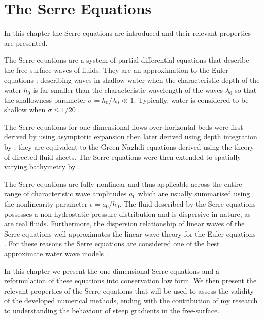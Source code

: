 
\chapter{The Serre Equations}
\label{chp:Serreeqns}
In this chapter the Serre equations are introduced and their relevant properties are presented.

The Serre equations are a system of partial differential equations that describe the free-surface waves of fluids. They are an approximation to the Euler equations \cite{Euler-1755-274}; describing waves in shallow water when the characteristic depth of the water $h_0$ is far smaller than the characteristic wavelength of the waves $\lambda_0$ so that the shallowness parameter $ \sigma = h_0 / \lambda_0  \ll 1 $. Typically, water is considered to be shallow when $\sigma  \le  1/ 20$ \cite{Sorenson-2006}.  

The Serre equations for one-dimensional flows over horizontal beds were first derived by \citet{Serre-F-1953-857} using asymptotic expansion then later derived using depth integration by \citet{Su-Gardener-1969-536}; they are equivalent to the Green-Naghdi equations \cite{Green-Naghdi-1976-237} derived using the theory of directed fluid sheets. The Serre equations were then extended to spatially varying bathymetry by \citet{Seabra-Santos-etal-1987-117}. 

The Serre equations are fully nonlinear and thus applicable across the entire range of characteristic wave amplitudes $a_0$ which are usually summarised using the nonlinearity parameter $\epsilon = a_0 / h_0$. The fluid described by the Serre equations possesses a non-hydrostatic pressure distribution and is dispersive in nature, as are real fluids. Furthermore, the dispersion relationship of linear waves of the Serre equations well approximates the linear wave theory for the Euler equations \cite{Barthelemy-2004-315}. For these reasons the Serre equations are considered one of the best approximate water wave models \cite{Bonneton-Lannes-2009-16601,Bonneton-etal-2011-1479}. 

In this chapter we present the one-dimensional Serre equations and a reformulation of these equations into conservation law form. We then present the relevant properties of the Serre equations that will be used to assess the validity of the developed numerical methods, ending with the contribution of my research to understanding the behaviour of steep gradients in the free-surface. 


